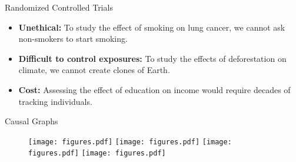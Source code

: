 \documentclass[aspectratio=169]{beamer}
\begin{document}
\begin{frame}{Randomized Controlled Trials}
	
	\vspace{2em}

	\begin{itemize}[<+->]
		\item \textbf{Unethical: } To study the effect of smoking on lung cancer, we cannot ask non-smokers to start smoking.
		\item \textbf{Difficult to control exposures:} To study the effects of deforestation on climate, we cannot create clones of Earth.
		\item \textbf{Cost:} Assessing the effect of education on income would require decades of tracking individuals.
	\end{itemize}

	\vspace{2em}

\end{frame}

\begin{frame}{Causal Graphs}
	\vspace{0.5em}
	\begin{figure}
		\begin{overprint}
			 \center \texttt{[image: figures.pdf]}
			\onslide<2> \center \texttt{[image: figures.pdf]}
			\onslide<3> \center \texttt{[image: figures.pdf]}
			\onslide<4> \center \texttt{[image: figures.pdf]}
		\end{overprint}
	\end{figure}

\end{frame}

% 
% 
% 
\end{document}
